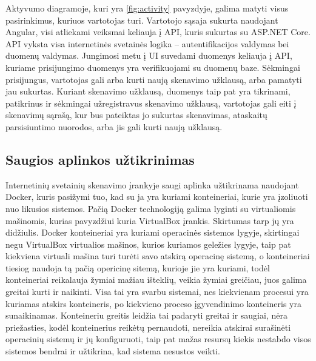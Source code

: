 \documentclass[a4paper,12pt,fleqn]{article}
\begin{document}
Aktyvumo diagramoje, kuri yra \ref{fig:activity} pavyzdyje, galima matyti visus pasirinkimus, kuriuos vartotojas turi. Vartotojo sąsaja sukurta naudojant Angular, visi atliekami veiksmai keliauja į API, kuris sukurtas su ASP.NET Core. API vyksta visa internetinės svetainės logika – autentifikacijos valdymas bei duomenų valdymas. Jungimosi metu į UI suvedami duomenys keliauja į API, kuriame prisijungimo duomenys yra verifikuojami su duomenų baze. Sėkmingai prisijungus, vartotojas gali arba kurti naują skenavimo užklausą, arba pamatyti jau sukurtas. Kuriant skenavimo užklausą, duomenys taip pat yra tikrinami, patikrinus ir sėkmingai užregistravus skenavimo užklausą, vartotojas gali eiti į skenavimų sąrašą, kur bus pateiktas jo sukurtas skenavimas, ataskaitų parsisiuntimo nuorodos, arba jis gali kurti naują užklausą.

\subsection{Saugios aplinkos užtikrinimas}
\label{sec:safe}

Internetinių svetainių skenavimo įrankyje saugi aplinka užtikrinama naudojant Docker, kuris pasižymi tuo, kad su ja yra kuriami konteineriai, kurie yra įzoliuoti nuo likusios sistemos. Pačią Docker technologiją galima lyginti su virtualiomis mašinomis, kurias pavyzdžiui kuria VirtualBox įrankis. Skirtumas tarp jų  yra didžiulis. Docker konteineriai yra kuriami operacinės sistemos lygyje, skirtingai negu VirtualBox virtualios mašinos, kurios kuriamos geležies lygyje, taip pat kiekviena virtuali mašina turi turėti savo atskirą operacinę sistemą, o konteineriai tiesiog naudoja tą pačią opericinę sitemą, kurioje jie yra kuriami, todėl konteineriai reikalauja žymiai mažiau išteklių, veikia žymiai greičiau, juos galima greitai kurti ir naikinti\cite{merkel2014docker}. Visa tai yra svarbu sistemai, nes kiekvienam procesui yra kuriamas atskirs konteineris, po kiekvieno proceso įgyvendinimo konteineris yra sunaikinamas. Konteineriu greitis leidžia tai padaryti greitai ir saugiai, nėra priežasties, kodėl konteinerius reikėtų pernaudoti, nereikia atskirai surašinėti operacinių sistemų ir jų konfiguruoti, taip pat mažas resursų kiekis nestabdo visos sistemos bendrai ir užtikrina, kad sistema nesustos veikti.
\end{document}
